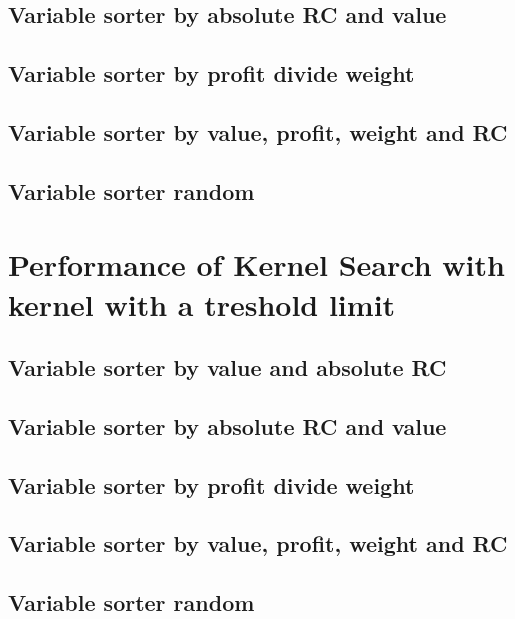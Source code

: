 \newpage
\subsection{Variable sorter by absolute RC and value}


\newpage
\subsection{Variable sorter by profit divide weight}


\newpage
\subsection{Variable sorter by value, profit, weight and RC}


\newpage
\subsection{Variable sorter random}


\newpage
\section{Performance of Kernel Search with kernel with a treshold limit}\label{Instances results kernel threshold}

\newpage
\subsection{Variable sorter by value and absolute RC}


\newpage
\subsection{Variable sorter by absolute RC and value}


\newpage
\subsection{Variable sorter by profit divide weight}


\newpage
\subsection{Variable sorter by value, profit, weight and RC}


\newpage
\subsection{Variable sorter random}
